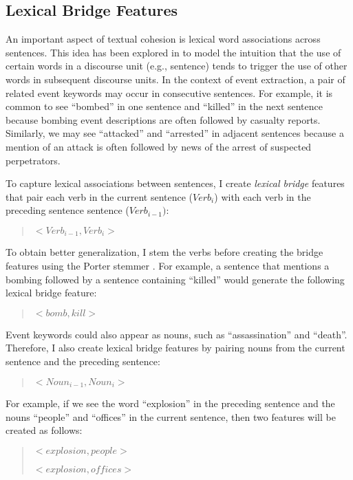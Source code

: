 \subsection{Lexical Bridge Features}
\label{lexical-bridges}

An important aspect of textual cohesion is lexical word
associations across sentences.  This idea has been explored in
\cite{Soricut06} to model the intuition that the use of certain
words in a discourse unit (e.g., sentence) tends to trigger the use of
other words in subsequent discourse units.  In the context of event
extraction,
a pair of related event keywords may occur in consecutive sentences.
For example, it is common to see ``bombed'' in one sentence and
``killed'' in the next sentence because bombing event descriptions are often followed
by casualty reports.
Similarly, we may see ``attacked'' and ``arrested'' in adjacent
sentences because a mention of an attack is often followed by news of
the arrest of suspected perpetrators.

To capture lexical associations between sentences, I create {\it lexical bridge} features that
pair each verb in the current sentence ($Verb_{i}$) with each verb in the preceding sentence
 sentence ($Verb_{i-1})$:
\vspace*{.08in}
\begin{quote}
{\it $<Verb_{i-1}, Verb_{i}>$}
\end{quote}
\vspace*{.08in}
To obtain better generalization, I stem the verbs before creating
the bridge features using the Porter stemmer \cite{Porter80}.  
For example, a sentence that mentions a bombing followed by a sentence
containing ``killed'' would generate the following lexical bridge
feature:  
\begin{quote}
{\it $<bomb, kill>$}
\end{quote}

Event keywords could also appear as nouns, such as ``assassination'' and ``death''.  Therefore, I also 
create lexical bridge features by pairing  nouns from the
current sentence and the preceding sentence:
\vspace*{.08in}
\begin{quote}
{\it $<Noun_{i-1}, Noun_{i}>$}
\end{quote}
\vspace*{.08in}
For example, if we see the word ``explosion'' in the preceding sentence and the nouns ``people'' and ``offices'' in the current sentence, then two features will be created as follows:
\begin{quote}
{\it $<explosion, people>$}

{\it $<explosion, offices>$}
\end{quote}
 
